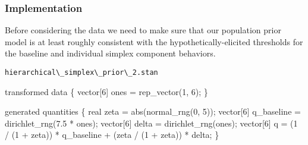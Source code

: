 \documentclass[
  letterpaper,
  DIV=11,
  numbers=noendperiod]{scrartcl}
\newenvironment{Shaded}{\begin{snugshade}}{\end{snugshade}}
\newcommand{\AttributeTok}[1]{\textcolor[rgb]{0.40,0.45,0.13}{#1}}
\newcommand{\DataTypeTok}[1]{\textcolor[rgb]{0.68,0.00,0.00}{#1}}
\newcommand{\DecValTok}[1]{\textcolor[rgb]{0.68,0.00,0.00}{#1}}
\newcommand{\FloatTok}[1]{\textcolor[rgb]{0.68,0.00,0.00}{#1}}
\newcommand{\FunctionTok}[1]{\textcolor[rgb]{0.28,0.35,0.67}{#1}}
\newcommand{\KeywordTok}[1]{\textcolor[rgb]{0.00,0.23,0.31}{#1}}
\newcommand{\NormalTok}[1]{\textcolor[rgb]{0.00,0.23,0.31}{#1}}
\newcommand{\OtherTok}[1]{\textcolor[rgb]{0.00,0.23,0.31}{#1}}
\newcommand{\SpecialCharTok}[1]{\textcolor[rgb]{0.37,0.37,0.37}{#1}}
\newcommand{\StringTok}[1]{\textcolor[rgb]{0.13,0.47,0.30}{#1}}
\begin{document}
\subsubsection{Implementation}\label{implementation-2}

Before considering the data we need to make sure that our population
prior model is at least roughly consistent with the
hypothetically-elicited thresholds for the baseline and individual
simplex component behaviors.

\begin{codelisting}

\caption{\texttt{hierarchical\textbackslash\_simplex\textbackslash\_prior\textbackslash\_2.stan}}

\begin{Shaded}
\begin{Highlighting}[]
\KeywordTok{transformed data}\NormalTok{ \{}
  \DataTypeTok{vector}\NormalTok{[}\DecValTok{6}\NormalTok{] ones = rep\_vector(}\DecValTok{1}\NormalTok{, }\DecValTok{6}\NormalTok{);}
\NormalTok{\}}

\KeywordTok{generated quantities}\NormalTok{ \{}
  \DataTypeTok{real}\NormalTok{ zeta = abs(normal\_rng(}\DecValTok{0}\NormalTok{, }\DecValTok{5}\NormalTok{));}
  \DataTypeTok{vector}\NormalTok{[}\DecValTok{6}\NormalTok{] q\_baseline = dirichlet\_rng(}\FloatTok{7.5}\NormalTok{ * ones);}
  \DataTypeTok{vector}\NormalTok{[}\DecValTok{6}\NormalTok{] delta = dirichlet\_rng(ones);}
  \DataTypeTok{vector}\NormalTok{[}\DecValTok{6}\NormalTok{] q =  (}\DecValTok{1}\NormalTok{    / (}\DecValTok{1}\NormalTok{ + zeta)) * q\_baseline}
\NormalTok{               + (zeta / (}\DecValTok{1}\NormalTok{ + zeta)) * delta;}
\NormalTok{\}}
\end{Highlighting}
\end{Shaded}

\end{codelisting}

\begin{Shaded}
\end{Shaded}
\end{document}
